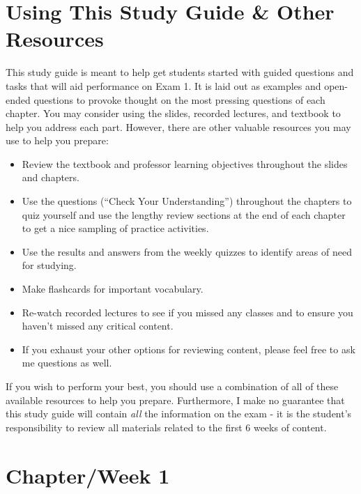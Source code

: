 \documentclass[
  12pt,
  letterpaper,
]{scrartcl}
\begin{document}
\section{Using This Study Guide \& Other Resources}\label{sec-using}

This study guide is meant to help get students started with guided
questions and tasks that will aid performance on Exam 1. It is laid out
as examples and open-ended questions to provoke thought on the most
pressing questions of each chapter. You may consider using the slides,
recorded lectures, and textbook to help you address each part. However,
there are other valuable resources you may use to help you prepare:

\begin{itemize}
\item
  Review the textbook and professor learning objectives throughout the
  slides and chapters.
\item
  Use the questions (``Check Your Understanding'') throughout the
  chapters to quiz yourself and use the lengthy review sections at the
  end of each chapter to get a nice sampling of practice activities.
\item
  Use the results and answers from the weekly quizzes to identify areas
  of need for studying.
\item
  Make flashcards for important vocabulary.
\item
  Re-watch recorded lectures to see if you missed any classes and to
  ensure you haven't missed any critical content.
\item
  If you exhaust your other options for reviewing content, please feel
  free to ask me questions as well.
\end{itemize}

If you wish to perform your best, you should use a combination of all of
these available resources to help you prepare. Furthermore, I make no
guarantee that this study guide will contain \emph{all} the information
on the exam - it is the student's responsibility to review all materials
related to the first 6 weeks of content.

\section{Chapter/Week 1}\label{sec-ch-1}
\end{document}
